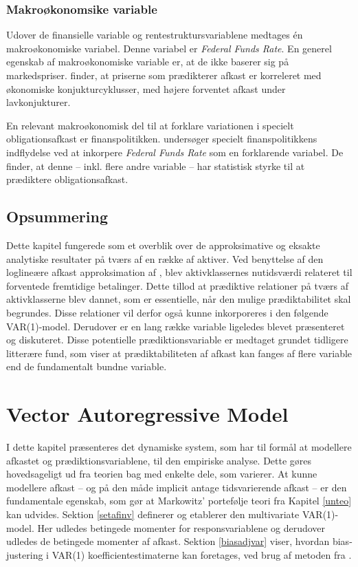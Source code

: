 \documentclass[
  a4paper,
  oneside]{memoir}
\begin{document}
\hypertarget{makrouxf8konomsike-variable}{%
\subsection{Makroøkonomsike variable}\label{makrouxf8konomsike-variable}}

Udover de finansielle variable og rentestruktursvariablene medtages én makroøkonomiske variabel. Denne variabel er \emph{Federal Funds Rate}. En generel egenskab af makroøkonomiske variable er, at de ikke baserer sig på markedspriser. \citep{Cochrane2008} finder, at priserne som prædikterer afkast er korreleret med økonomiske konjukturcyklusser, med højere forventet afkast under lavkonjukturer.

En relevant makroøkonomisk del til at forklare variationen i specielt obligationsafkast er finanspolitikken. \citep{Dai2005} undersøger specielt finanspolitikkens indflydelse ved at inkorpere \emph{Federal Funds Rate} som en forklarende variabel. De finder, at denne -- inkl. flere andre variable -- har statistisk styrke til at prædiktere obligationsafkast.

\hypertarget{opsafkrel}{%
\section{Opsummering}\label{opsafkrel}}

Dette kapitel fungerede som et overblik over de approksimative og eksakte analytiske resultater på tværs af en række af aktiver. Ved benyttelse af den loglineære afkast approksimation af \citep{Campbell1988}, blev aktivklassernes nutidsværdi relateret til forventede fremtidige betalinger. Dette tillod at prædiktive relationer på tværs af aktivklasserne blev dannet, som er essentielle, når den mulige prædiktabilitet skal begrundes. Disse relationer vil derfor også kunne inkorporeres i den følgende VAR(1)-model. Derudover er en lang række variable ligeledes blevet præsenteret og diskuteret. Disse potentielle prædiktionsvariable er medtaget grundet tidligere litterære fund, som viser at prædiktabiliteten af afkast kan fanges af flere variable end de fundamentalt bundne variable.

\hypertarget{varkapitel}{%
\chapter{Vector Autoregressive Model}\label{varkapitel}}

I dette kapitel præsenteres det dynamiske system, som har til formål at modellere afkastet og prædiktionsvariablene, til den empiriske analyse. Dette gøres hovedsageligt ud fra teorien bag \citep{Userguide2004} med enkelte dele, som varierer. At kunne modellere afkast -- og på den måde implicit antage tidsvarierende afkast -- er den fundamentale egenskab, som gør at Markowitz' portefølje teori fra Kapitel \ref{unteo} kan udvides. Sektion \ref{setafinv} definerer og etablerer den multivariate VAR(1)-model. Her udledes betingede momenter for responsvariablene og derudover udledes de betingede momenter af afkast. Sektion \ref{biasadjvar} viser, hvordan bias-justering i VAR(1) koefficientestimaterne kan foretages, ved brug af metoden fra \citep{Engsted2012, Pope1990}.
\end{document}

